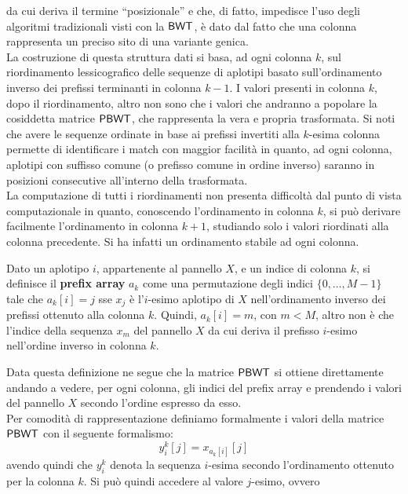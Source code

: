 da cui deriva il termine ``posizionale'' e che, di fatto, impedisce l'uso degli
algoritmi tradizionali visti con la $\mbox{\rm {\sf BWT}}$, è dato dal fatto che una
colonna rappresenta un preciso sito di una variante genica. \\
La costruzione di questa struttura dati si basa, ad ogni colonna $k$, sul
riordinamento lessicografico delle sequenze di aplotipi basato sull'ordinamento
inverso dei prefissi terminanti in colonna $k-1$. I valori presenti in colonna
$k$, dopo il riordinamento, altro non sono che i valori che andranno a popolare
la cosiddetta matrice $\mbox{\rm {\sf PBWT}}$, che rappresenta la vera e propria
trasformata. Si noti che avere le sequenze 
ordinate in base ai prefissi invertiti alla $k$-esima colonna permette di
identificare i match con maggior facilità in quanto, ad ogni colonna, aplotipi
con suffisso comune (o prefisso comune in ordine inverso) saranno in posizioni
consecutive all'interno della trasformata.\\
La computazione di tutti i riordinamenti non presenta difficoltà dal punto di
vista computazionale in quanto, conoscendo l'ordinamento in colonna $k$, si può
derivare facilmente l'ordinamento in colonna $k+1$, studiando solo i valori
riordinati alla colonna precedente. Si ha infatti un ordinamento stabile ad ogni
colonna. 
\begin{definizione}
  Dato un aplotipo $i$, appartenente al pannello $X$, e un indice di colonna
  $k$, si definisce il \textbf{prefix array} $a_k$ come una permutazione degli
  indici $\{0,\ldots, M-1\}$ tale che $a_k[i]=j$ sse $x_j$ è l'$i$-esimo
  aplotipo di 
  $X$ nell'ordinamento inverso dei prefissi ottenuto alla colonna $k$. Quindi,
  $a_k[i]=m$, con $m<M$, altro non è che l'indice della sequenza $x_m$ del
  pannello $X$ da cui deriva il prefisso $i$-esimo nell'ordine inverso
  in colonna $k$.
\end{definizione}
Data questa definizione ne segue che la matrice $\mbox{\rm {\sf PBWT}}$ si ottiene
direttamente andando a vedere, per ogni colonna, gli indici del prefix
  array e prendendo i valori del pannello $X$ secondo l'ordine espresso da
esso.\\ 
Per comodità di rappresentazione definiamo formalmente i valori della
 matrice $\mbox{\rm {\sf PBWT}}$ con il seguente formalismo:
\begin{equation}
  \label{eq:pbwty}
  y_i^k[j]=x_{a_k[i]}[j]
\end{equation}
avendo quindi che $y_i^k$ denota la sequenza $i$-esima secondo l'ordinamento
ottenuto per la colonna $k$. Si può quindi accedere al valore $j$-esimo, ovvero
